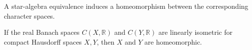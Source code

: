 \begin{definition}
\label{def:bs-char-homeo}
\leanok
A star-algebra equivalence induces a homeomorphism between the corresponding character spaces.
\end{definition}

\begin{theorem}
\label{thm:banach-stone}
\leanok
{}
If the real Banach spaces $C(X,\mathbb R)$ and $C(Y,\mathbb R)$ are linearly isometric for compact Hausdorff spaces $X,Y$, then $X$ and $Y$ are homeomorphic.
\end{theorem}
